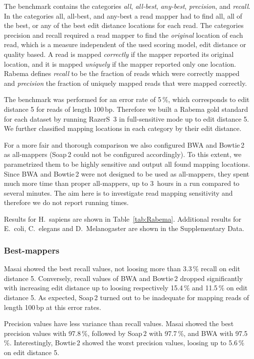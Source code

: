 The benchmark contains the categories \emph{all}, \emph{all-best}, \emph{any-best}, \emph{precision}, and \emph{recall}.
In the categories all, all-best, and any-best a read mapper had to find all, all of the best, or any of the best edit distance locations for each read.
The categories precision and recall required a read mapper to find the \emph{original} location of each read, which is a measure independent of the used scoring model, \eg edit distance or quality based.
A read is mapped \emph{correctly} if the mapper reported its original location, 
and it is mapped \emph{uniquely} if the mapper reported only one location.
Rabema defines \emph{recall} to be the fraction of reads which were correctly mapped and \emph{precision} the fraction of uniquely mapped reads that were mapped correctly.

The benchmark was performed for an error rate of 5\,\%, which corresponds to edit distance 5 for reads of length 100\,bp. Therefore we built a Rabema gold standard for each dataset by running RazerS~3 in full-sensitive mode up to edit distance 5. We further classified mapping locations in each category by their edit distance.

For a more fair and thorough comparison we also configured BWA and Bowtie\,2 as all-mappers (Soap\,2 could not be configured accordingly).
To this extent, we parametrized them to be highly sensitive and output all found mapping locations.
Since BWA and Bowtie\,2 were not designed to be used as all-mappers, they spent much more time than proper all-mappers, \ie up to 3~hours in a run compared to several minutes.
The aim here is to investigate read mapping sensitivity and therefore we do not report running times.

Results for H.~sapiens are shown in Table~\ref{tab:Rabema}.
Additional results for E.~coli, C.~elegans and D.~Melanogaster are shown in the Supplementary Data.

\subsubsection{Best-mappers}
Masai showed the best recall values, not loosing more than 3.3\,\% recall on edit distance 5.
Conversely, recall values of BWA and Bowtie\,2 dropped significantly with increasing edit distance up to loosing respectively 15.4\,\% and 11.5\,\% on edit distance 5.
As expected, Soap\,2 turned out to be inadequate for mapping reads of length 100\,bp at this error rates.

Precision values have less variance than recall values. Masai showed the best precision values with 97.8\,\%, followed by Soap\,2 with 97.7\,\%, and BWA with 97.5\,\%. Interestingly, Bowtie\,2 showed the worst precision values, loosing up to 5.6\,\% on edit distance 5.

